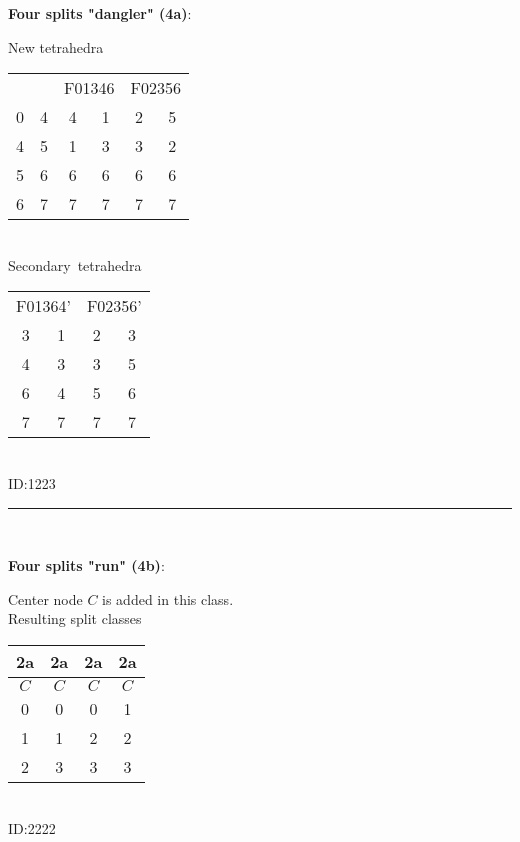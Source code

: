 \documentclass{article}
\begin{document}
	\begin{minipage}{0.5\textwidth}
		\textbf{Four splits "dangler" (4a)}:

		\begin{center}
			
		\end{center}
	\end{minipage}
	\begin{minipage}{0.5\textwidth}
		New tetrahedra

		\begin{tabular}{cccccc}
			\hline
			& & \multicolumn{2}{c}{F01346} & \multicolumn{2}{c}{F02356}\\
			0 & 4 & 4 & 1 & 2 & 5 \\
			4 & 5 & 1 & 3 & 3 & 2 \\
			5 & 6 & 6 & 6 & 6 & 6 \\
			6 & 7 & 7 & 7 & 7 & 7
		\end{tabular}
		\\

		Secondary~tetrahedra

		\begin{tabular}{cccc}
			\hline
			\multicolumn{2}{c}{F01364'} & \multicolumn{2}{c}{F02356'} \\
			3 & 1 & 2 & 3 \\
			4 & 3 & 3 & 5 \\
			6 & 4 & 5 & 6 \\
			7 & 7 & 7 & 7
		\end{tabular}
		\\

		ID:1223
	\end{minipage}

	\rule{\textwidth}{0.5pt}
	\\

	\begin{minipage}{0.5\textwidth}
		\textbf{Four splits "run" (4b)}:

		\begin{center}
			
		\end{center}
	\end{minipage}
	\begin{minipage}{0.5\textwidth}
		Center node $C$ is added in this class.
		\\

		Resulting split classes

		\begin{tabular}{cccc}
			\hline
			2a & 2a & 2a & 2a \\
			\hline
			$C$ & $C$ & $C$ & $C$ \\
			0 & 0 & 0 & 1 \\
			1 & 1 & 2 & 2 \\
			2 & 3 & 3 & 3
		\end{tabular}
		\\

		ID:2222
	\end{minipage}
\end{document}
